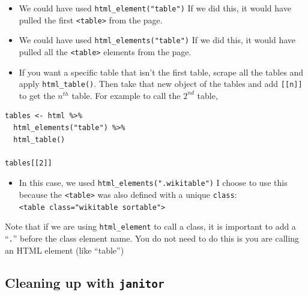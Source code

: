 \documentclass[
  letterpaper,
  DIV=11,
  numbers=noendperiod]{scrartcl}
\providecommand{\tightlist}{%
  \setlength{\itemsep}{0pt}\setlength{\parskip}{0pt}}\usepackage{longtable,booktabs,array}
\begin{document}
\begin{itemize}
\item
  We could have used \texttt{html\_element("table")} If we did this, it
  would have pulled the first \texttt{\textless{}table\textgreater{}}
  from the page.
\item
  We could have used \texttt{html\_elements("table")} If we did this, it
  would have pulled all the \texttt{\textless{}table\textgreater{}}
  elements from the page.
\item
  If you want a specific table that isn't the first table, scrape all
  the tables and apply \texttt{html\_table()}. Then take that new object
  of the tables and add \texttt{{[}{[}n{]}{]}} to get the \(n^{th}\)
  table. For example to call the \(2^{nd}\) table,
\end{itemize}

\begin{verbatim}
tables <- html %>% 
  html_elements("table") %>%
  html_table() 
  
tables[[2]]
\end{verbatim}

\begin{itemize}
\tightlist
\item
  In this case, we used \texttt{html\_elements(".wikitable")} I choose
  to use this because the \texttt{\textless{}table\textgreater{}} was
  also defined with a unique \texttt{class}:
  \texttt{\textless{}table\ class="wikitable\ sortable"\textgreater{}}
\end{itemize}

\begin{tcolorbox}[enhanced jigsaw, toprule=.15mm, colbacktitle=quarto-callout-warning-color!10!white, breakable, bottomtitle=1mm, leftrule=.75mm, arc=.35mm, coltitle=black, opacitybacktitle=0.6, opacityback=0, bottomrule=.15mm, colframe=quarto-callout-warning-color-frame, toptitle=1mm, colback=white, left=2mm, titlerule=0mm, title=\textcolor{quarto-callout-warning-color}{\faExclamationTriangle}\hspace{0.5em}{Warning}, rightrule=.15mm]

Note that if we are using \texttt{html\_element} to call a class, it is
important to add a ``\texttt{.}'' before the class element name. You do
not need to do this is you are calling an HTML element (like ``table'')

\end{tcolorbox}

\hypertarget{cleaning-up-with-janitor}{%
\subsection{\texorpdfstring{Cleaning up with
\texttt{janitor}}{Cleaning up with janitor}}\label{cleaning-up-with-janitor}}
\end{document}
